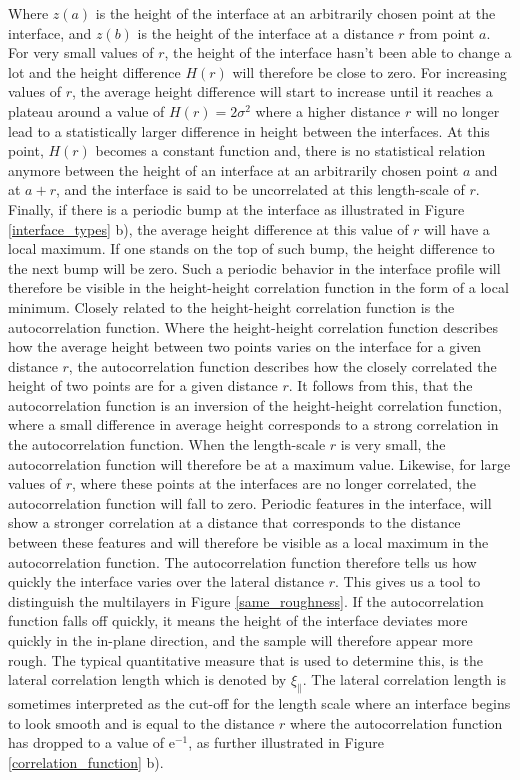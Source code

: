 Where $z(a)$ is the height of the interface at an arbitrarily chosen point at the interface, and $z(b)$ is the height of the interface at a distance $r$ from point $a$. For very small values of $r$, the height of the interface hasn't been able to change a lot and the height difference $H(r)$ will therefore be close to zero. For increasing values of $r$, the average height difference will start to increase until it reaches a plateau around a value of $H(r) = 2\sigma^2$ where a higher distance $r$ will no longer lead to a statistically larger difference in height between the interfaces. At this point, $H(r)$ becomes a constant function and, there is no statistical relation anymore between the height of an interface at an arbitrarily chosen point $a$ and at $a+r$, and the interface is said to be uncorrelated at this length-scale of $r$. Finally, if there is a periodic bump at the interface as illustrated in Figure \ref{interface_types} b), the average height difference at this value of $r$ will have a local maximum. If one stands on the top of such bump, the height difference to the next bump will be zero. Such a periodic behavior in the interface profile will therefore be visible in the height-height correlation function in the form of a local minimum. Closely related to the height-height correlation function is the autocorrelation function. Where the height-height correlation function describes how the average height between two points varies on the interface for a given distance $r$, the autocorrelation function describes how the closely correlated the height of two points are for a given distance $r$. It follows from this, that the autocorrelation function is an inversion of the height-height correlation function, where a small difference in average height corresponds to a strong correlation in the autocorrelation function. When the length-scale $r$ is very small, the autocorrelation function will therefore be at a maximum value. Likewise, for large  values of $r$, where these points at the interfaces are no longer correlated, the autocorrelation function will fall to zero. Periodic features in the interface, will show a stronger correlation at a distance that corresponds to the distance between these features and will therefore be visible as a local maximum in the autocorrelation function. 
The autocorrelation function therefore tells us how quickly the interface varies over the lateral distance $r$.  This gives us a tool to distinguish the multilayers in Figure \ref{same_roughness}. If the autocorrelation function falls off quickly, it means the height of the interface deviates more quickly in the in-plane direction, and the sample will therefore appear more rough. The typical quantitative measure that is used to determine this, is the lateral correlation length which is denoted by $\xi_{\parallel}$. The lateral correlation length is sometimes interpreted as the cut-off for the length scale where an interface begins to look smooth and is equal to the distance $r$ where the autocorrelation function has dropped to a value of e$^{-1}$, as further illustrated in Figure \ref{correlation_function} b). 
